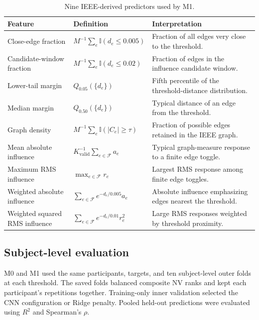 \begin{table}[htbp]
    \centering
    \scriptsize
    \setlength{\tabcolsep}{3pt}
    \renewcommand{\arraystretch}{1.05}
    \begin{tabular}{@{}p{} p{} p{}@{}}
        \toprule
        \textbf{Feature} & \textbf{Definition} & \textbf{Interpretation} \\
        \midrule
        Close-edge fraction & $M^{-1}\sum_e\mathbb{I}(d_e\leq0.005)$ & Fraction of all edges very close to the threshold. \\
        Candidate-window fraction & $M^{-1}\sum_e\mathbb{I}(d_e\leq0.02)$ & Fraction of edges in the influence candidate window. \\
        Lower-tail margin & $Q_{0.05}(\{d_e\})$ & Fifth percentile of the threshold-distance distribution. \\
        Median margin & $Q_{0.50}(\{d_e\})$ & Typical distance of an edge from the threshold. \\
        Graph density & $M^{-1}\sum_e\mathbb{I}(|C_e|\geq\tau)$ & Fraction of possible edges retained in the IEEE graph. \\
        Mean absolute influence & $K_{\mathrm{valid}}^{-1}\sum_{e\in\mathcal{F}}a_e$ & Typical graph-measure response to a finite edge toggle. \\
        Maximum RMS influence & $\max_{e\in\mathcal{F}}r_e$ & Largest RMS response among finite edge toggles. \\
        Weighted absolute influence & $\sum_{e\in\mathcal{F}}e^{-d_e/0.005}a_e$ & Absolute influence emphasizing edges nearest the threshold. \\
        Weighted squared RMS influence & $\sum_{e\in\mathcal{F}}e^{-d_e/0.01}r_e^2$ & Large RMS responses weighted by threshold proximity. \\
        \bottomrule
    \end{tabular}
    \caption{Nine IEEE-derived predictors used by M1.}
    \label{tab:compact-ridge-features}
\end{table}


\subsection{Subject-level evaluation}

M0 and M1 used the same participants, targets, and ten subject-level outer folds at each threshold. The saved folds balanced composite NV ranks and kept each participant's repetitions together. Training-only inner validation selected the CNN configuration or Ridge penalty. Pooled held-out predictions were evaluated using $R^2$ and Spearman's $\rho$.


